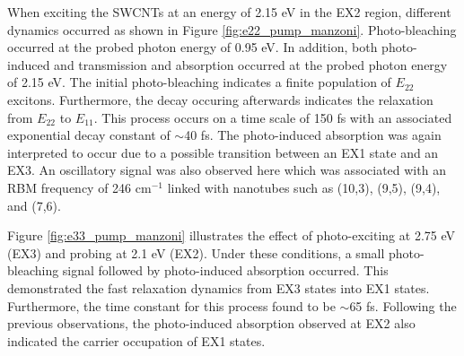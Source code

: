 When exciting the SWCNTs at an energy of 2.15 eV in the EX2 region, different dynamics occurred as shown in Figure \ref{fig:e22_pump_manzoni}. Photo-bleaching occurred at the probed photon energy of 0.95 eV. In addition, both photo-induced and transmission and absorption occurred at the probed photon energy of 2.15 eV. The initial photo-bleaching indicates a finite population of $E_{22}$ excitons. Furthermore, the decay occuring afterwards indicates the relaxation from $E_{22}$ to $E_{11}$. This process occurs on a time scale of 150 fs with an associated exponential decay constant of $\sim$40 fs. The photo-induced absorption was again interpreted to occur due to a possible transition between an EX1 state and an EX3. An oscillatory signal was also observed here which was associated with an RBM frequency of 246 $\text{cm}^{-1}$ linked with nanotubes such as (10,3), (9,5), (9,4), and (7,6).

Figure \ref{fig:e33_pump_manzoni} illustrates the effect of photo-exciting at 2.75 eV (EX3) and probing at 2.1 eV (EX2). Under these conditions, a small photo-bleaching signal followed by photo-induced absorption occurred. This demonstrated the fast relaxation dynamics from EX3 states into EX1 states. Furthermore, the time constant for this process found to be $\sim$65 fs. Following the previous observations, the photo-induced absorption observed at EX2 also indicated the carrier occupation of EX1 states.

